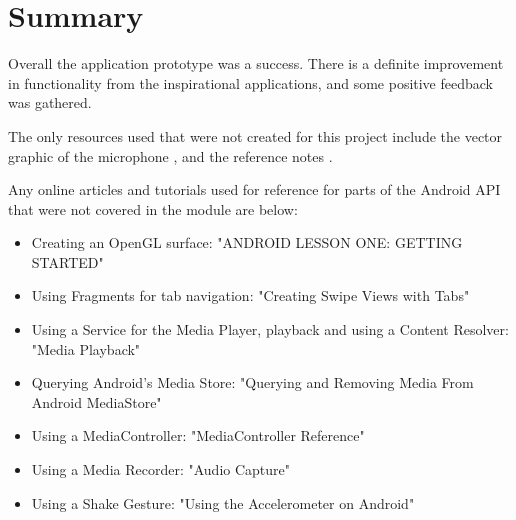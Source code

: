 \documentclass[conference]{acmsiggraph}
\begin{document}
\section{Summary}

Overall the application prototype was a success. There is a definite improvement in functionality from the inspirational applications, and some positive feedback was gathered. 

The only resources used that were not created for this project include the vector graphic of the microphone \cite{microphone}, and the reference notes \cite{refNotes}.

Any online articles and tutorials used for reference for parts of the Android API that were not covered in the module are below:
\begin{itemize}
	\item Creating an OpenGL surface: "ANDROID LESSON ONE: GETTING STARTED" \cite{OpenGL}
	\item Using Fragments for tab navigation: "Creating Swipe Views with Tabs" \cite{Swipetut}
	\item Using a Service for the Media Player, playback and using a Content Resolver: "Media Playback" \cite{Service}
	\item Querying Android's Media Store: "Querying and Removing Media From Android MediaStore" \cite{MediaStore}
	\item Using a MediaController: "MediaController Reference" \cite{MediaController}
	\item Using a Media Recorder: "Audio Capture" \cite{audio}
	\item Using a Shake Gesture: "Using the Accelerometer on Android" \cite{accel}
\end{itemize}




\end{document}
